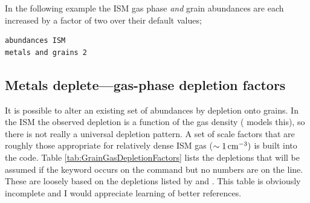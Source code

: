 In the following example the ISM gas phase \emph{and}
grain abundances are each
increased by a factor of two over their default values;
\begin{verbatim}
abundances ISM
metals and grains 2
\end{verbatim}

\subsection{Metals deplete---gas-phase depletion factors}

It is possible to alter an existing set of abundances by depletion onto
grains.
In the ISM the observed depletion is a function of the gas density
(\citealp{Spitzer1985} models this), so there is not really a universal depletion
pattern.  A set of scale factors that are roughly those appropriate for
relatively dense ISM gas ($\sim 1 {\rm\thinspace cm^{-3}})$ is built into the code.
Table \ref{tab:GrainGasDepletionFactors} lists
the depletions that will be assumed if the keyword
 occurs on the
 command but no numbers are on the line.
These are loosely based
on the depletions listed by \citet{Jenkins1987} and \citet{Cowie1986}.
This table is obviously incomplete and I would appreciate learning of better references.


